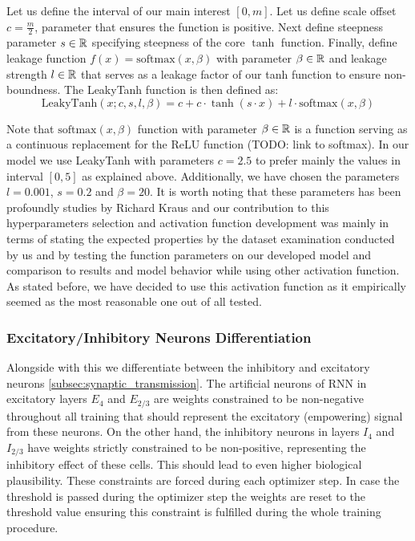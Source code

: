 \begin{defn}[LeakyTanh]
    Let us define the interval of our main interest $[0, m]$. Let us define scale offset $c = \frac{m}{2}$, parameter that ensures the function is positive. Next define steepness parameter $s \in \mathbb{R}$ specifying steepness of the core $\tanh$ function. Finally, define leakage function $f(x) = \text{softmax}(x, \beta)$ with parameter $\beta \in \mathbb{R}$ and leakage strength $l \in \mathbb{R}$ that serves as a leakage factor of our tanh function to ensure non-boundness. The LeakyTanh function is then defined as:
        $$\text{LeakyTanh}(x; c, s, l, \beta) = c + c \cdot \tanh(s \cdot x) + l \cdot \text{softmax}(x, \beta)$$
\end{defn}
\label{def:leakytanh}

Note that $\text{softmax}(x, \beta)$ function with parameter $\beta \in \mathbb{R}$ is a function serving as a continuous replacement for the ReLU function (TODO: link to softmax). In our model we use LeakyTanh with parameters $c=2.5$ to prefer mainly the values in interval $[0, 5]$ as explained above. Additionally, we have chosen the parameters $l=0.001$, $s=0.2$ and $\beta=20$. It is worth noting that these parameters has been profoundly studies by Richard Kraus and our contribution to this hyperparameters selection and activation function development was mainly in terms of stating the expected properties by the dataset examination conducted by us and by testing the function parameters on our developed model and comparison to results and model behavior while using other activation function. As stated before, we have decided to use this activation function as it empirically seemed as the most reasonable one out of all tested.

\subsubsection{Excitatory/Inhibitory Neurons Differentiation}
\label{subsubsec:exc_inh_differentiation}

Alongside with this we differentiate between the inhibitory and excitatory neurons \ref{subsec:synaptic_transmission}. The artificial neurons of RNN in excitatory layers $E_4$ and $E_{2/3}$ are weights constrained to be non-negative throughout all training that should represent the excitatory (empowering) signal from these neurons. On the other hand, the inhibitory neurons in layers $I_4$ and $I_{2/3}$ have weights strictly constrained to be non-positive, representing the inhibitory effect of these cells. This should lead to even higher biological plausibility. These constraints are forced during each optimizer step. In case the threshold is passed during the optimizer step the weights are reset to the threshold value ensuring this constraint is fulfilled during the whole training procedure.

